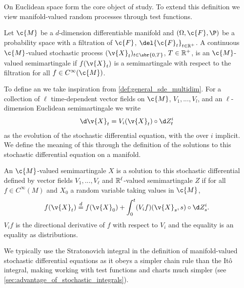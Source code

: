 On Euclidean space  form the core object of study.
To extend this definition we view manifold-valued random processes through test functions.
\begin{definition}
	Let \(\c{M}\) be a \(d\)-dimension differentiable manifold and \((\Omega, \c{F}, \P)\) be a probability space with a filtration of \(\c{F}\), \(\del{\c{F}_t}_{t\in\R^+}\).
	A continuous \(\c{M}\)-valued stochastic process \((\v{X}_t)_{t\in\sbr{0,T}}\), \(T\in \mathbb{R}^+\), is an \(\c{M}\)-valued semimartingale if \(f(\v{X}_t)\) is a semimartingale with respect to the filtration for all \(f \in C^\infty(\c{M})\).
\end{definition}

To define an  we take inspiration from \cref{def:general_sde_multidim}.
For a collection of \(\ell\) time-dependent vector fields on \(\c{M}\), \(V_1, ..., V_l\), and an \(\ell\)-dimension Euclidean semimartingale we write
\[\d\v{X}_t = V_i(\v{X}_t) \circ \d Z^i_t\]
as the evolution of the stochastic differential equation, with the  over \(i\) implicit.
We define the meaning of this through the definition of the solutions to this stochastic differential equation on a manifold.
\begin{definition}
	An \(\c{M}\)-valued semimartingale \(X\) is a solution to this stochastic differential defined by vector fields \(V_1, ..., V_\ell\) and \(\mathbb{R}^\ell\)-valued semimartingale \(Z\) if for all \(f\in C^\infty(M)\) and \(X_0\) a random variable taking values in \(\c{M}\),
	\[
		f(\v{X}_t) \overset{d}{=} f(\v{X}_0) + \int_0^t (V_i f)(\v{X}_s, s) \circ \d Z_s^i.
	\]
	\(V_i f\) is the directional derivative of \(f\) with respect to \(V_i\) and the equality is an equality as distributions.
\end{definition}
We typically use the Stratonovich integral in the definition of manifold-valued stochastic differential equations as it obeys a simpler chain rule than the {I}t\^o integral, making working with test functions and charts much simpler (see \cref{sec:advantage_of_stochastic_integrals}).

